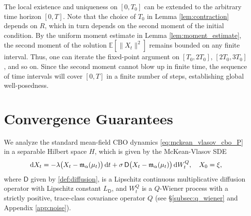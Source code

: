 \documentclass[12pt]{amsart}
\newcommand{\D}[1]{\mbox{\rm #1}}
\newcommand{\dd}{\D{d}}
\numberwithin{equation}{section}
\begin{document}
The local existence and uniqueness on $[0, T_0]$ can be extended to the arbitrary time horizon $[0, T]$. Note that the choice of $T_0$ in Lemma \ref{lem:contraction} depends on $R$, which in turn depends on the second moment of the initial condition. By the uniform moment estimate in Lemma \ref{lem:moment_estimate}, the second moment of the solution $\mathbb{E}[\|X_t\|^2]$ remains bounded on any finite interval. Thus, one can iterate the fixed-point argument on $[T_0, 2T_0]$, $[2T_0, 3T_0]$, and so on. Since the second moment cannot blow up in finite time, the sequence of time intervals will cover $[0, T]$ in a finite number of steps, establishing global well-posedness.



\section{Convergence Guarantees}
\label{sec:convergence}

We analyze the standard mean-field CBO dynamics \eqref{eq:mckean_vlasov_cbo_P} in a separable Hilbert space $H$, which is given by the McKean-Vlasov SDE 
\begin{equation} \label{eq:mckean_vlasov_cbo_degenerate}
    \dd X_t = -\lambda \big(X_t - \mathfrak{m}_\alpha(\mu_t)\big)\,\dd t + \sigma \,\mathsf{D}\big(X_t - \mathfrak{m}_{\alpha}(\mu_t)\big)\, \dd W_t^Q, \quad X_0 = \xi,
\end{equation}
where $\mathsf{D}$ given by \eqref{def:diffusion}, is a Lipschitz continuous multiplicative diffusion operator with Lipschitz constant $L_{\mathsf{D}}$, and $W_t^Q$ is a $Q$-Wiener process with a strictly positive, trace-class covariance operator $Q$ (see \S\ref{subsec:q_wiener} and Appendix \ref{app:noise}).
 
\end{document}
